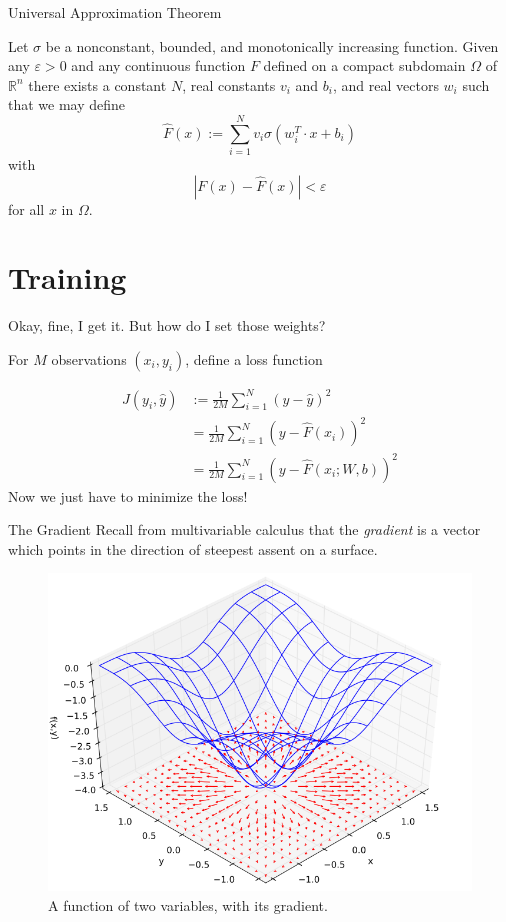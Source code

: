 \documentclass[11pt]{beamer}
\let\epsilon=\varepsilon
\newcommand{\R}{\mathbb{R}}
\begin{document}
\begin{frame}{Universal Approximation Theorem}
\begin{theorem}
Let $\sigma$ be a nonconstant, bounded, and monotonically increasing function.
Given any $\epsilon > 0$ and any continuous function $F$ defined on a compact subdomain $\Omega$ of $\R^n$ there exists a constant $N$, real constants $v_i$ and $b_i$, and real vectors $w_i$ such that we may define
$$\widehat{F}(x) := \sum_{i = 1}^N v_i \sigma(w_i^T \cdot x + b_i)$$
with
$$\left|F(x) - \widehat{F}(x)\right| < \epsilon$$
for all $x$ in $\Omega$.
\end{theorem}
\end{frame}

\section{Training}
\begin{frame}{Okay, fine, I get it. But how do I set those weights?}

For $M$ observations $(x_i, y_i)$, define a loss function

\begin{align*}
J(y_i, \widehat{y}) &:= \frac{1}{2M}\sum_{i =1}^N (y - \widehat{y})^2 \\
&= \frac{1}{2M}\sum_{i =1}^N \left(y - \widehat{F}(x_i)\right)^2 \\
&= \frac{1}{2M}\sum_{i =1}^N \left(y - \widehat{F}(x_i; W, b)\right)^2 
\end{align*}
Now we just have to minimize the loss!
\end{frame}

\begin{frame}{The Gradient}
Recall from multivariable calculus that the \emph{gradient} is a vector which points in the direction of steepest assent on a surface.
\begin{center}
\begin{figure}
\includegraphics[scale=0.25]{720px-Gradient_Visual}
\caption{A function of two variables, with its gradient.}
\end{figure}
\end{center}
\end{frame}
\end{document}
